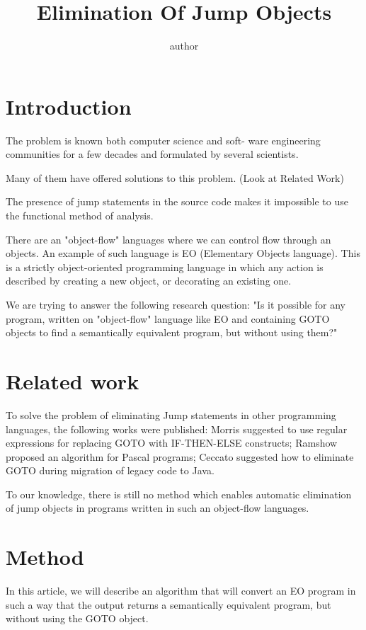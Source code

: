 \documentclass[sigplan,review,11pt,nonacm,natbib=false]{acmart}
\title{Elimination Of Jump Objects}
\author{author}
\begin{document}
\maketitle



\section{Introduction}
The problem is known both computer science and soft-
ware engineering communities for a few decades and formulated by several scientists.

Many of them have offered solutions to this problem. (Look at Related Work)

The presence of jump statements in the source code makes it impossible to use the functional method of analysis.

There are an "object-flow" languages where we can control flow through an objects. An example of such language is EO (Elementary Objects language). This is a strictly object-oriented programming language in which any action is described by creating a new object, or decorating an existing one.

We are trying to answer the following research question: "Is it possible for any program, written on "object-flow" language like EO and containing GOTO objects to find a semantically equivalent program, but without using them?"

\section{Related work}
To solve the problem of eliminating Jump statements in other programming languages, the following works were published:
Morris suggested to use regular expressions for replacing GOTO with IF-THEN-ELSE constructs;
Ramshow proposed an algorithm for Pascal programs;
Ceccato suggested how to eliminate GOTO during migration of legacy code to Java.

To our knowledge, there is still no method which enables automatic elimination of jump objects in programs written in such an object-flow languages.

\section{Method}
In this article, we will describe an algorithm that will convert an EO program in such a way that the output returns a semantically equivalent program, but without using the GOTO object.
\end{document}
